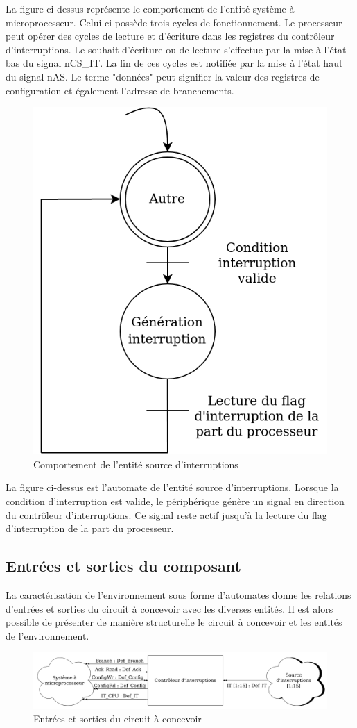 La figure ci-dessus représente le comportement de l'entité système à microprocesseur.
Celui-ci possède trois cycles de fonctionnement.
Le processeur peut opérer des cycles de lecture et d'écriture dans les registres du contrôleur d'interruptions.
Le souhait d'écriture ou de lecture s'effectue par la mise à l'état bas du signal nCS\_IT.
La fin de ces cycles est notifiée par la mise à l'état haut du signal nAS.
Le terme "données" peut signifier la valeur des registres de configuration et également l'adresse de branchements.\\


\begin{figure}[H]
	\centering
	\includegraphics[width=0.5\linewidth]{figure/spec_automate_src_int.png}
	\caption{Comportement de l'entité source d'interruptions}
	\label{fig:spec_automate_src_it}
\end{figure}

La figure ci-dessus est l'automate de l'entité source d'interruptions.
Lorsque la condition d'interruption est valide, le périphérique génère un signal en direction du contrôleur d'interruptions.
Ce signal reste actif jusqu'à la lecture du flag d'interruption de la part du processeur.

\subsection{Entrées et sorties du composant}

La caractérisation de l'environnement sous forme d'automates donne les relations d'entrées et sorties du circuit à concevoir avec les diverses entités.
Il est alors possible de présenter de manière structurelle le circuit à concevoir et les entités de l'environnement.

\begin{figure}[H]
	\centering
	\includegraphics[width=1\linewidth]{figure/entrees_sorties_composant.png}
	\caption{Entrées et sorties du circuit à concevoir}
	\label{fig:entrees_sorties_composant}
\end{figure}

